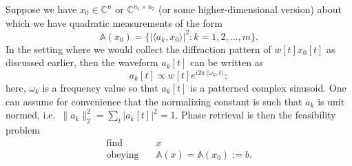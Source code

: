 \documentclass[11pt]{article}
\newcommand{\C}{\mathbb{C}}
\newcommand{\<}{\langle}
\renewcommand{\>}{\rangle}
\newcommand{\mapA}{\mathbb{A}}
\numberwithin{equation}{section}
\begin{document}
Suppose we have $x_0 \in \C^n$ or $\C^{n_1 \times n_2}$ (or some
higher-dimensional version) about which we have quadratic measurements
of the form
\begin{equation}
  \mapA(x_0) = \{|\<a_k, x_0\>|^2 : k = 1, 2, \ldots, m\}.
\label{nonlinearmap}
\end{equation}
In the setting where we would collect the diffraction pattern of $w[t]
x_0[t]$ as discussed earlier, then the waveform $a_k[t]$ can be written as 
\[
a_k[t] \propto w[t] e^{i2\pi \, \<\omega_k, t\>};
\]
here, $\omega_k$ is a frequency value so that $a_k[t]$ is a patterned
complex sinusoid. One can assume for convenience that the normalizing
constant is such that $a_k$ is unit normed, i.e.~$\|a_k\|_2^2 = \sum_t
|a_k[t]|^2 = 1$.  Phase retrieval is then the feasibility problem
\begin{equation}
\label{eq:retrieval}
  \begin{array}{ll}
    \text{find}   & \quad x\\ 
\text{obeying} & \quad  \mapA(x) = \mapA(x_0) := b.
  \end{array}
\end{equation}
\end{document}
